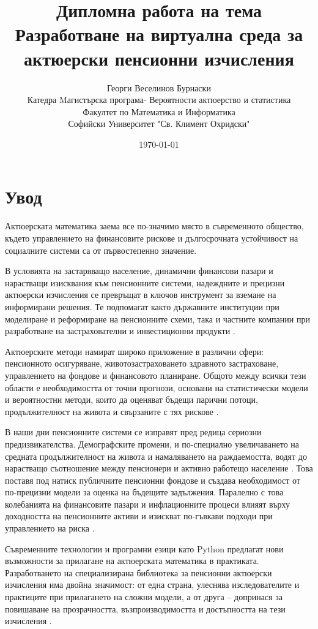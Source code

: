 \documentclass[a4paper,12pt]{article}
\title{\textbf{Дипломна работа на тема
        \\[0.5em] \large{Разработване на виртуална среда за актюерски пенсионни изчисления}}}
\author{Георги Веселинов Бурнаски
        \\ Катедра Mагистърска програма- Вероятности актюерство и статистика
        \\ Факултет по Математика и Информатика
        \\ Софийски Университет "Св. Климент Охридски"}
\date{\today}
\begin{document}
\maketitle
\newpage
\section{Увод}
Актюерската математика заема все по-значимо място в съвременното общество, където управлението на финансовите рискове и дългосрочната устойчивост на социалните системи са от първостепенно значение.

В условията на застаряващо население, динамични финансови пазари и нарастващи изисквания към пенсионните системи, надеждните и прецизни актюерски изчисления се превръщат в ключов инструмент за вземане на информирани решения. Те подпомагат както държавните институции при моделиране и реформиране на пенсионните схеми, така и частните компании при разработване на застрахователни и инвестиционни продукти \cite{dalriada2023}.

Актюерските методи намират широко приложение в различни сфери:
пенсионното осигуряване, животозастраховането здравното застраховане, управлението на фондове и финансовото планиране. Общото между всички тези области е необходимостта от точни прогнози, основани на статистически модели и вероятностни методи, които да оценяват бъдещи парични потоци, продължителност на живота и свързаните с тях рискове \cite{milliman2022}.

В наши дни пенсионните системи се изправят пред редица сериозни предизвикателства. Демографските промени, и по-специално увеличаването на средната продължителност на живота и намаляването на раждаемостта, водят до нарастващо съотношение между пенсионери и
активно работещо население \cite{bostonfed1999}. Това поставя под натиск публичните пенсионни фондове и създава необходимост от по-прецизни модели за оценка на бъдещите задължения. Паралелно с това колебанията на финансовите пазари и инфлационните процеси влияят върху доходността на пенсионните активи и изискват по-гъвкави подходи при управлението на риска \cite{ncpers2023}.

Съвременните технологии и програмни езици като Python предлагат нови възможности за прилагане на актюерската математика в практиката. Разработването на специализирана библиотека за пенсионни актюерски изчисления има двойна значимост: от една страна, улеснява изследователите и практиците при прилагането на сложни модели, а от друга – допринася за повишаване на прозрачността, възпроизводимостта и достъпността на тези изчисления \cite{lifelib2024, hyperexponential2023}.
\end{document}

